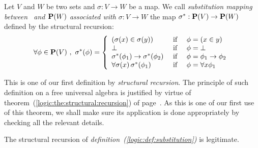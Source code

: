 \begin{defin}\label{logic:def:substitution}
    Let $V$ and $W$ be two sets and $\sigma:V\to W$ be a map. We call
    {\em substitution mapping between \pv\ and ${\bf P}(W)$ associated
    with $\sigma:V\to W$} the map $\sigma^{*}:\mbox{${\bf P}(V)$}\to{\bf P}(W)$ defined
    by the structural recursion:
    \begin{equation}\label{logic:eqn:substitution:recursion}
        \forall\phi\in\mbox{${\bf P}(V)$}\ ,\ \sigma^{*}(\phi)=\left\{
            \begin{array}{lcl}
                (\sigma(x)\in\sigma(y))
                    &\mbox{\ if\ }&
                \phi=(x\in y)
                \\
                \bot
                    &\mbox{\ if\ }&
                \phi=\bot
                \\
                \sigma^{*}(\phi_{1})\to \sigma^{*}(\phi_{2}) 
                    &\mbox{\ if\ }&
                \phi=\phi_{1}\to\phi_{2}
                \\
                \forall\sigma(x)\,\sigma^{*}(\phi_{1})
                    &\mbox{\ if\ }&
                \phi=\forall x\phi_{1}
            \end{array}\right.
    \end{equation}
\end{defin}

This is one of our first definition by {\em structural recursion}.
The principle of such definition on a free universal algebra is
justified by virtue of
theorem~(\ref{logic:the:structural:recursion}) of
page~\pageref{logic:the:structural:recursion}. As this is one of our
first use of this theorem, we shall make sure its application is
done appropriately by checking all the relevant details.

\begin{prop}\label{logic:prop:substitution}
    The structural recursion of {\em definition~(\ref{logic:def:substitution})} 
    is legitimate.
\end{prop}

